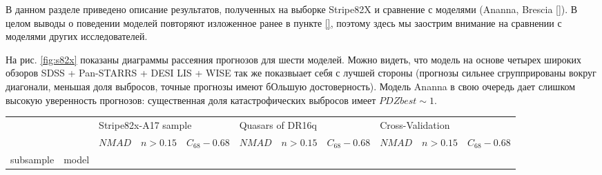\documentclass[fleqn,usenatbib]{mnras}
\begin{document}
В данном разделе приведено описание результатов, полученных на выборке Stripe82X и сравнение с моделями (Ananna, Brescia \ref{}). В целом выводы о поведении моделей повторяют изложенное ранее в пункте \ref{}, поэтому здесь мы заострим внимание на сравнении с моделями других исследователей.

На рис. \ref{fig:s82x} показаны диаграммы рассеяния прогнозов для шести моделей. Можно видеть, что модель на основе четырех широких обзоров SDSS + Pan-STARRS + DESI LIS + WISE так же показвыает себя с лучшей стороны (прогнозы сильнее сгруппрированы вокруг диагонали, меньшая доля выбросов, точные прогнозы имеют бОльшую достоверность). Модель Ananna в свою очередь дает слишком высокую уверенность прогнозов: существенная доля катастрофических выбросов имеет $PDZbest \sim 1$.

\begin{table}
	\begin{tabular}{llrrrrrrrrr}
            \hline
                              &                  & \multicolumn{3}{l}{Stripe82x-A17 sample} & \multicolumn{3}{l}{Quasars of DR16q} & \multicolumn{3}{l}{Cross-Validation} \\
                              &                  &               $NMAD$ &        $n>0.15$ &  $C_{68} - 0.68$ &           $NMAD$ &        $n>0.15$ &  $C_{68} - 0.68$ &           $NMAD$ &        $n>0.15$ &  $C_{68} - 0.68$ \\
            subsample & model &                      &                 &                  &                  &                 &                  &                  &                 &                  \\


\end{tabular}
\end{table}
\end{document}
